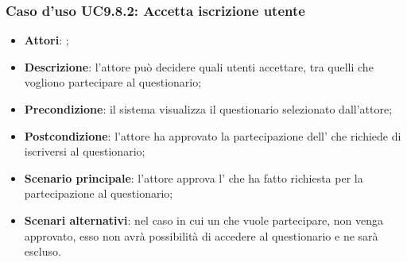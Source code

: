 		 \subsubsection{Caso d'uso UC9.8.2: Accetta iscrizione utente}
		 \label{UC9.8.2}
		 \begin{itemize}
			 	\item \textbf{Attori}: \uaupro{};
			 	\item \textbf{Descrizione}: l'attore può decidere quali utenti accettare, tra quelli che vogliono partecipare al questionario; 
			 	\item \textbf{Precondizione}: il sistema visualizza il questionario selezionato dall'attore; 
			 	\item \textbf{Postcondizione}: l'attore ha approvato la partecipazione dell'\uau{} che richiede di iscriversi al questionario;
			 	\item \textbf{Scenario principale}: l'attore approva l'\uau{} che ha fatto richiesta per la partecipazione al questionario; 
			 	\item \textbf{Scenari alternativi}: nel caso in cui un \uau{} che vuole partecipare, non venga approvato, esso non avrà possibilità di accedere al questionario e ne sarà escluso.
		 \end{itemize}
			
				